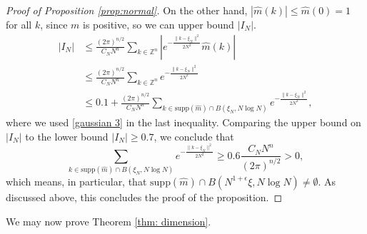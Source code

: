 \documentclass[11pt,letterpaper]{amsart}
\theoremstyle{definition}
\theoremstyle{plain}
\newcommand{\Z}{{\mathbb Z}}
\begin{document}
\begin{proof}[Proof of Proposition \ref{prop:normal}]
On the other hand, $|\widehat{m}(k)|\le \widehat{m}(0)=1$ for all $k$, since $m$ is positive, so we can upper bound $|I_N|$.
\begin{align*}
    |I_{N}| & 
    \le\frac{(2\pi)^{n/2}}{C_{N}N^{n}}\sum_{k\in\Z^n}\left|e^{-\frac{\|k-\xi_{N}\|^2}{2N^2}}\widehat{m}(k)\right|\\
    &
    \le\frac{(2\pi)^{n/2}}{C_{N}N^{n}}\sum_{k\in\Z^n}e^{-\frac{\|k-\xi_{N}\|^2}{2N^2}}\\
    &\le  0.1+\frac{(2\pi)^{n/2}}{C_{N}N^{n}}\sum_{k\in\mathrm{supp}(\widehat{m})\cap B(\xi_{N},N\log N)}e^{-\frac{\|k-\xi_{N}\|^2}{2N^2}},
\end{align*}
 where we used \eqref{gaussian 3} in the last inequality. Comparing the upper bound on $|I_{N}|$ to the lower bound $|I_{N}|\ge 0.7$, we conclude that
\[\sum_{k\in\mathrm{supp}(\widehat{m})\cap B(\xi_N,N\log N)}e^{-\frac{\|k-\xi_{N}\|^2}{2N^2}}\ge 0.6\frac{C_{N}N^{n}}{(2\pi)^{n/2}}>0,\]
which means, in particular, that $\mathrm{supp}(\widehat{m})\cap B(N^{1+\epsilon}\xi,N\log N)\ne\emptyset$. As discussed above, this concludes the proof of the proposition.
\end{proof}
We may now prove Theorem \ref{thm: dimension}.
\end{document}
